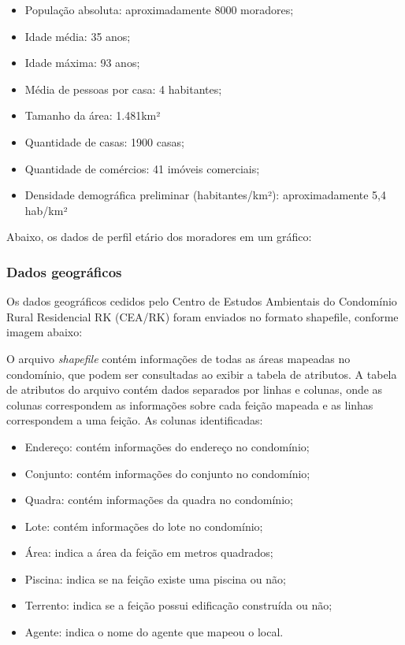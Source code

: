 \begin{itemize}
\item População absoluta: aproximadamente 8000 moradores;
\item Idade média: 35 anos;
\item Idade máxima: 93 anos;
\item Média de pessoas por casa: 4 habitantes;
\item Tamanho da área: 1.481km²
\item Quantidade de casas: 1900 casas;
\item Quantidade de comércios: 41 imóveis comerciais;
\item Densidade demográfica preliminar (habitantes/km²): aproximadamente 5,4 hab/km²
\end{itemize}

Abaixo, os dados de perfil etário dos moradores em um gráfico:


\subsubsection{Dados geográficos}

Os dados geográficos cedidos pelo Centro de Estudos Ambientais do Condomínio Rural Residencial RK (CEA/RK) foram enviados no formato shapefile, conforme imagem abaixo:


O arquivo \textit{shapefile} contém informações de todas as áreas mapeadas no condomínio, que podem ser consultadas ao exibir a tabela de atributos. A tabela de atributos do arquivo contém dados separados por linhas e colunas, onde as colunas correspondem as informações sobre cada feição mapeada e as linhas correspondem a uma feição. As colunas identificadas:

\begin{itemize}
\item Endereço: contém informações do endereço no condomínio;
\item Conjunto: contém informações do conjunto no condomínio;
\item Quadra: contém informações da quadra no condomínio;
\item Lote: contém informações do lote no condomínio;
\item Área: indica a área da feição em metros quadrados;
\item Piscina: indica se na feição existe uma piscina ou não;
\item Terrento: indica se a feição possui edificação construída ou não;
\item Agente: indica o nome do agente que mapeou o local.
\end{itemize}


